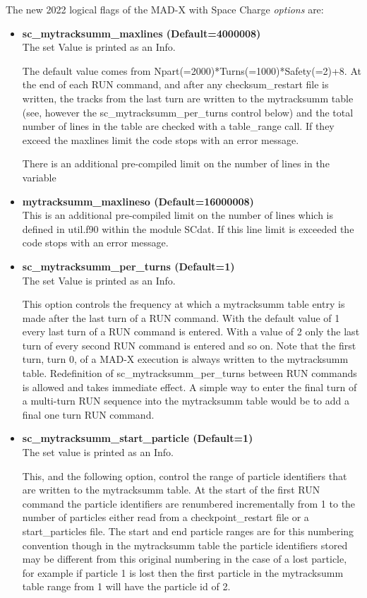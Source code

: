 The new 2022 logical flags of the MAD-X with Space Charge {\it
  options} are:

\begin{itemize}
\item {\bf sc\_mytracksumm\_maxlines (Default=4000008)} \\The set
  Value is printed as an Info.

The default value comes from
Npart(=2000)*Turns(=1000)*Safety(=2)+8. At the end of each RUN
command, and after any checksum\_restart file is written, the tracks
from the last turn are written to the mytracksumm table (see, however
the sc\_mytracksumm\_per\_turns control below) and the total number of
lines in the table are checked with a table\_range call. If they
exceed the maxlines limit the code stops with an error message.

There is an additional pre-compiled limit on the number of lines in
the variable

\item {\bf mytracksumm\_maxlineso (Default=16000008)} \\This is an
  additional pre-compiled limit on the number of lines which is
  defined in util.f90 within the module SCdat. If this line limit is
  exceeded the code stops with an error message.

\item {\bf sc\_mytracksumm\_per\_turns (Default=1)}  \\The set Value
  is printed as an Info.


This option controls the frequency at which a mytracksumm table entry
is made after the last turn of a RUN command. With the default value of 1
every last turn of a RUN command is entered. With a value of 2 only the
last turn of every second RUN command is entered and so on. Note
that the first turn, turn 0, of a MAD-X execution is always written to
the mytracksumm table. Redefinition of sc\_mytracksumm\_per\_turns
between RUN commands is allowed and takes immediate effect. A simple way
to enter the final turn of a multi-turn RUN sequence into the
mytracksumm table would be to add a final one turn RUN command.


\item {\bf sc\_mytracksumm\_start\_particle (Default=1)} \\  The set
value is printed as an Info.

This, and the following option, control the range of particle
identifiers that are written to the mytracksumm table. At the
start of the first RUN command the particle identifiers are renumbered
incrementally from 1 to the number of particles either read from a
checkpoint\_restart file or a start\_particles file. The start and end
particle ranges are for this numbering
convention though in the mytracksumm table the particle identifiers
stored may be different from this original numbering in the case of a
lost
particle, for example if particle 1 is lost then the first particle in
the mytracksumm table range from 1 will have the particle id of 2.


\end{itemize}
